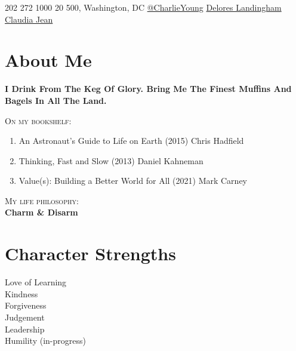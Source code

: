 \documentclass{rmjCV}
\begin{document}
\vspace{0.15cm}
\vspace{0.15cm}

 {202 272 1000} {20 500, Washington, DC} {\href{https://twitter.com} {\faTwitter \hspace{0.1cm}@CharlieYoung}} {\href{https://github.com}{\faGithub \hspace{0.1cm}Delores Landingham}} {\href{https://www.linkedin.com}{\faLinkedin \hspace{0.1cm}Claudia Jean}}

\setlength{\columnsep}{0.5cm}

\begin{paracol}{2}

\begin{leftcolumn}
	\section{About Me}
\textbf{I Drink From The Keg Of Glory. Bring Me The Finest Muffins And Bagels In All The Land.} %


\noindent \textsc{On my bookshelf:}
\begin{enumerate}
	\item An Astronaut's Guide to Life on Earth (2015) Chris Hadfield
	\item Thinking, Fast and Slow (2013) Daniel Kahneman
	\item Value(s): Building a Better World for All (2021) Mark Carney
\end{enumerate}

\noindent \textsc{My life philosophy:}\\
\textbf{Charm \& Disarm}

	\section{Character Strengths}
Love of Learning\\
Kindness\\
Forgiveness\\
Judgement\\
Leadership\\
Humility (in-progress)


\end{leftcolumn}
\end{paracol}
\end{document}
